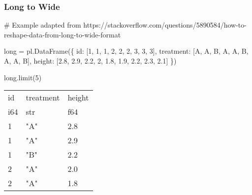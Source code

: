 \documentclass[
  letterpaper,
  DIV=11,
  numbers=noendperiod]{scrartcl}
\newenvironment{Shaded}{\begin{snugshade}}{\end{snugshade}}
\newcommand{\BuiltInTok}[1]{\textcolor[rgb]{0.00,0.23,0.31}{#1}}
\newcommand{\CommentTok}[1]{\textcolor[rgb]{0.37,0.37,0.37}{#1}}
\newcommand{\DecValTok}[1]{\textcolor[rgb]{0.68,0.00,0.00}{#1}}
\newcommand{\FloatTok}[1]{\textcolor[rgb]{0.68,0.00,0.00}{#1}}
\newcommand{\NormalTok}[1]{\textcolor[rgb]{0.00,0.23,0.31}{#1}}
\newcommand{\OperatorTok}[1]{\textcolor[rgb]{0.37,0.37,0.37}{#1}}
\newcommand{\StringTok}[1]{\textcolor[rgb]{0.13,0.47,0.30}{#1}}
\begin{document}
\hypertarget{long-to-wide}{%
\subsubsection{Long to Wide}\label{long-to-wide}}

\begin{Shaded}
\begin{Highlighting}[]
\CommentTok{\# Example adapted from https://stackoverflow.com/questions/5890584/how{-}to{-}reshape{-}data{-}from{-}long{-}to{-}wide{-}format}

\BuiltInTok{long} \OperatorTok{=}\NormalTok{ pl.DataFrame(\{}
    \StringTok{\textquotesingle{}id\textquotesingle{}}\NormalTok{: [}\DecValTok{1}\NormalTok{, }\DecValTok{1}\NormalTok{, }\DecValTok{1}\NormalTok{, }\DecValTok{2}\NormalTok{, }\DecValTok{2}\NormalTok{, }\DecValTok{2}\NormalTok{, }\DecValTok{3}\NormalTok{, }\DecValTok{3}\NormalTok{, }\DecValTok{3}\NormalTok{],}
    \StringTok{\textquotesingle{}treatment\textquotesingle{}}\NormalTok{: [}\StringTok{\textquotesingle{}A\textquotesingle{}}\NormalTok{, }\StringTok{\textquotesingle{}A\textquotesingle{}}\NormalTok{, }\StringTok{\textquotesingle{}B\textquotesingle{}}\NormalTok{, }\StringTok{\textquotesingle{}A\textquotesingle{}}\NormalTok{, }\StringTok{\textquotesingle{}A\textquotesingle{}}\NormalTok{, }\StringTok{\textquotesingle{}B\textquotesingle{}}\NormalTok{, }\StringTok{\textquotesingle{}A\textquotesingle{}}\NormalTok{, }\StringTok{\textquotesingle{}A\textquotesingle{}}\NormalTok{, }\StringTok{\textquotesingle{}B\textquotesingle{}}\NormalTok{],}
    \StringTok{\textquotesingle{}height\textquotesingle{}}\NormalTok{: [}\FloatTok{2.8}\NormalTok{, }\FloatTok{2.9}\NormalTok{, }\FloatTok{2.2}\NormalTok{, }\DecValTok{2}\NormalTok{, }\FloatTok{1.8}\NormalTok{, }\FloatTok{1.9}\NormalTok{, }\FloatTok{2.2}\NormalTok{, }\FloatTok{2.3}\NormalTok{, }\FloatTok{2.1}\NormalTok{]}
\NormalTok{    \})}
  
\BuiltInTok{long}\NormalTok{.limit(}\DecValTok{5}\NormalTok{)}
\end{Highlighting}
\end{Shaded}

\begin{longtable}[]{@{}lll@{}}
\toprule()
id & treatment & height \\
i64 & str & f64 \\
\midrule()
\endhead
1 & "A" & 2.8 \\
1 & "A" & 2.9 \\
1 & "B" & 2.2 \\
2 & "A" & 2.0 \\
2 & "A" & 1.8 \\
\bottomrule()
\end{longtable}
\end{document}
